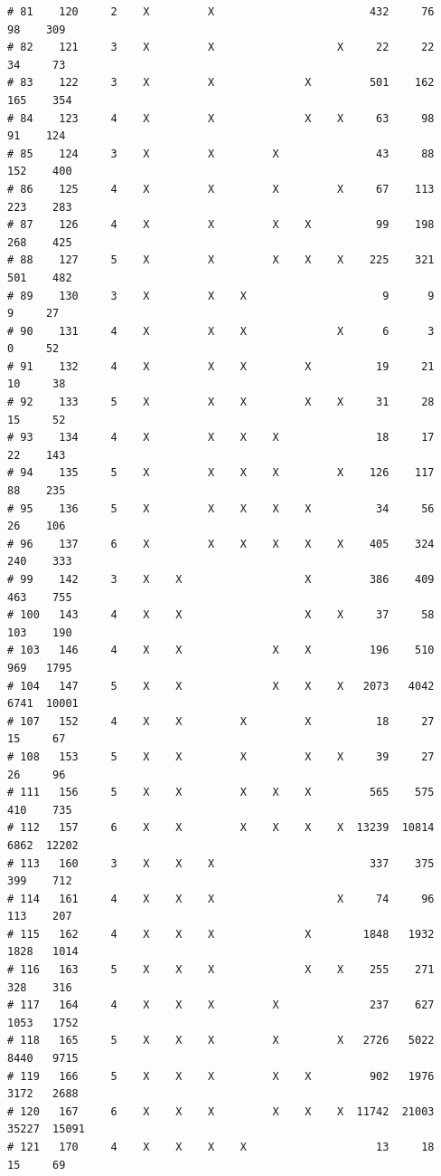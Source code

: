 \documentclass{article}\usepackage[]{graphicx}\usepackage[]{color}
\makeatletter
\newenvironment{kframe}{%
 \def\at@end@of@kframe{}%
 \ifinner\ifhmode%
  \def\at@end@of@kframe{\end{minipage}}%
  \begin{minipage}{\columnwidth}%
 \fi\fi%
 \def\FrameCommand##1{\hskip\@totalleftmargin \hskip-\fboxsep
 \colorbox{shadecolor}{##1}\hskip-\fboxsep
     \hskip-\linewidth \hskip-\@totalleftmargin \hskip\columnwidth}%
 \MakeFramed {\advance\hsize-\width
   \@totalleftmargin\z@ \linewidth\hsize
   \@setminipage}}%
 {\par\unskip\endMakeFramed%
 \at@end@of@kframe}
\newenvironment{knitrout}{}{} %
\makeatother
\begin{document}
\begin{knitrout}
\begin{kframe}
\begin{verbatim}
# 81    120     2    X         X                        432     76     98    309
# 82    121     3    X         X                   X     22     22     34     73
# 83    122     3    X         X              X         501    162    165    354
# 84    123     4    X         X              X    X     63     98     91    124
# 85    124     3    X         X         X               43     88    152    400
# 86    125     4    X         X         X         X     67    113    223    283
# 87    126     4    X         X         X    X          99    198    268    425
# 88    127     5    X         X         X    X    X    225    321    501    482
# 89    130     3    X         X    X                     9      9      9     27
# 90    131     4    X         X    X              X      6      3      0     52
# 91    132     4    X         X    X         X          19     21     10     38
# 92    133     5    X         X    X         X    X     31     28     15     52
# 93    134     4    X         X    X    X               18     17     22    143
# 94    135     5    X         X    X    X         X    126    117     88    235
# 95    136     5    X         X    X    X    X          34     56     26    106
# 96    137     6    X         X    X    X    X    X    405    324    240    333
# 99    142     3    X    X                   X         386    409    463    755
# 100   143     4    X    X                   X    X     37     58    103    190
# 103   146     4    X    X              X    X         196    510    969   1795
# 104   147     5    X    X              X    X    X   2073   4042   6741  10001
# 107   152     4    X    X         X         X          18     27     15     67
# 108   153     5    X    X         X         X    X     39     27     26     96
# 111   156     5    X    X         X    X    X         565    575    410    735
# 112   157     6    X    X         X    X    X    X  13239  10814   6862  12202
# 113   160     3    X    X    X                        337    375    399    712
# 114   161     4    X    X    X                   X     74     96    113    207
# 115   162     4    X    X    X              X        1848   1932   1828   1014
# 116   163     5    X    X    X              X    X    255    271    328    316
# 117   164     4    X    X    X         X              237    627   1053   1752
# 118   165     5    X    X    X         X         X   2726   5022   8440   9715
# 119   166     5    X    X    X         X    X         902   1976   3172   2688
# 120   167     6    X    X    X         X    X    X  11742  21003  35227  15091
# 121   170     4    X    X    X    X                    13     18     15     69

\end{verbatim}
\end{kframe}
\end{knitrout}
\end{document}
